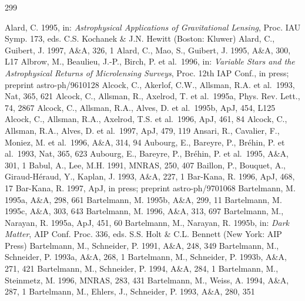 \documentclass[a4paper,10pt]{article} %
\begin{document}
\begin{thebibliography}{299} %
\setlength{\itemsep}{0pt} %

  Alard, C. 1995, in: {\em Astrophysical Applications of Gravitational
  Lensing\/}, Proc. IAU Symp. 173, eds. C.S. Kochanek \& J.N. Hewitt
  (Boston: Kluwer)
  Alard, C., Guibert, J. 1997, A\&A, 326, 1
  Alard, C., Mao, S., Guibert, J. 1995, A\&A, 300, L17
  Albrow, M., Beaulieu, J.-P., Birch, P. et al.\ 1996, in: {\em
  Variable Stars and the Astrophysical Returns of Microlensing
  Surveys\/}, Proc. 12th IAP Conf., in press; preprint
  astro-ph/9610128
  Alcock, C., Akerlof, C.W., Allsman, R.A. et al.\ 1993, Nat, 365, 621
  Alcock, C., Allsman, R., Axelrod, T. et al.\ 1995a, Phys. Rev. Lett.,
  74, 2867
  Alcock, C., Allsman, R.A., Alves, D. et al.\ 1995b, ApJ, 454, L125
  Alcock, C., Allsman, R.A., Axelrod, T.S. et al.\ 1996, ApJ, 461, 84
  Alcock, C., Allsman, R.A., Alves, D. et al.\ 1997, ApJ, 479, 119
  Ansari, R., Cavalier, F., Moniez, M. et al.\ 1996, A\&A, 314, 94
  Aubourg, E., Bareyre, P., Br\'ehin, P. et al.\ 1993, Nat, 365, 623
  Aubourg, E., Bareyre, P., Br\'ehin, P. et al.\ 1995, A\&A, 301, 1
  Babul, A., Lee, M.H. 1991, MNRAS, 250, 407
  Baillon, P., Bouquet, A., Giraud-H\'eraud, Y., Kaplan, J. 1993,
  A\&A, 227, 1
  Bar-Kana, R. 1996, ApJ, 468, 17
  Bar-Kana, R. 1997, ApJ, in press; preprint astro-ph/9701068
  Bartelmann, M. 1995a, A\&A, 298, 661
  Bartelmann, M. 1995b, A\&A, 299, 11
  Bartelmann, M. 1995c, A\&A, 303, 643
  Bartelmann, M. 1996, A\&A, 313, 697
  Bartelmann, M., Narayan, R. 1995a, ApJ, 451, 60
  Bartelmann, M., Narayan, R. 1995b, in: {\em Dark Matter\/}, AIP
  Conf. Proc. 336, eds. S.S. Holt \& C.L. Bennett (New York: AIP
  Press)
  Bartelmann, M., Schneider, P. 1991, A\&A, 248, 349
  Bartelmann, M., Schneider, P. 1993a, A\&A, 268, 1
  Bartelmann, M., Schneider, P. 1993b, A\&A, 271, 421
  Bartelmann, M., Schneider, P. 1994, A\&A, 284, 1
  Bartelmann, M., Steinmetz, M. 1996, MNRAS, 283, 431
  Bartelmann, M., Weiss, A. 1994, A\&A, 287, 1
  Bartelmann, M., Ehlers, J., Schneider, P. 1993, A\&A, 280, 351

\end{thebibliography}
\end{document}
